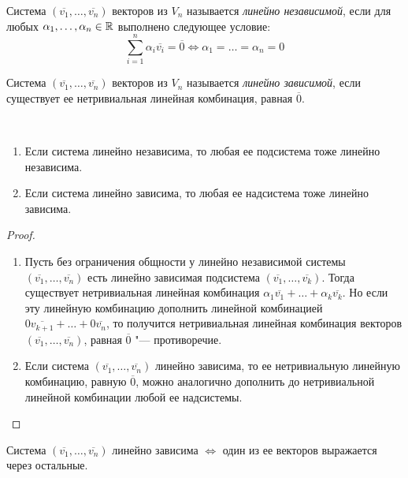     \begin{definition}
    	Система $(\overline{v_1}, \dots, \overline{v_n})$ векторов из $V_n$ называется \textit{линейно независимой}, если для любых $\alpha_1, \dotsc, \alpha_n \in \mathbb{R}$ выполнено следующее условие:
    	\[\sum_{i = 1}^{n}\alpha_i\overline{v_i} = \overline{0} \Leftrightarrow \alpha_1 = \dots = \alpha_n = 0\]
    \end{definition}
    
    \begin{definition}
    	Система $(\overline{v_1}, \dots, \overline{v_n})$ векторов из $V_n$ называется \textit{линейно зависимой}, если существует ее нетривиальная линейная комбинация, равная $\overline{0}$.
    \end{definition}
    
    \begin{proposition}~
    	\begin{enumerate}
    		\item Если система линейно независима, то любая ее подсистема тоже линейно независима.
    		\item Если система линейно зависима, то любая ее надсистема тоже линейно зависима.
    	\end{enumerate}
    \end{proposition}
    
    \begin{proof}~
    	\begin{enumerate}
    		\item Пусть без ограничения общности у линейно независимой системы $(\overline{v_1}, \dots, \overline{v_n})$ есть линейно зависимая подсистема $(\overline{v_1}, \dots, \overline{v_k})$. Тогда существует нетривиальная линейная комбинация $\alpha_1\overline{v_1} + \dots + \alpha_k\overline{v_k}$. Но если эту линейную комбинацию дополнить линейной комбинацией $0\overline{v_{k+1}} + \dots + 0\overline{v_n}$, то получится нетривиальная линейная комбинация векторов $(\overline{v_1}, \dots, \overline{v_n})$, равная $\overline{0}$ "--- противоречие.
    		
    		\item Если система $(\overline{v_1}, \dots, \overline{v_n})$ линейно зависима, то ее нетривиальную линейную комбинацию, равную $\overline{0}$, можно аналогично дополнить до нетривиальной линейной комбинации любой ее надсистемы.\qedhere
    	\end{enumerate}
    \end{proof}
    
    \begin{proposition}
    	Система $(\overline{v_1}, \dots, \overline{v_n})$ линейно зависима $\Leftrightarrow$ один из ее векторов выражается через остальные.
    \end{proposition}
    
